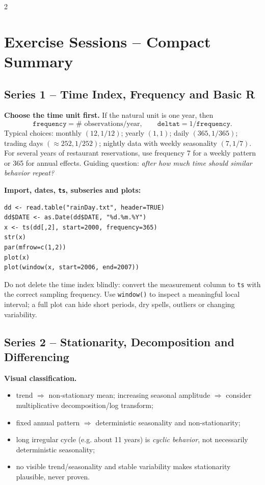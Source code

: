 \documentclass[9pt,a4paper]{extarticle}
\newcommand{\key}[1]{\textbf{#1}}
\begin{document}
\begin{multicols}{2}
\section{Exercise Sessions -- Compact Summary}

\subsection*{Series 1 -- Time Index, Frequency and Basic R}

\key{Choose the time unit first.} If the natural unit is one year, then
\[
\boxed{\texttt{frequency}=\#\text{ observations/year},\qquad
\texttt{deltat}=1/\texttt{frequency}.}
\]
Typical choices: monthly \((12,1/12)\); yearly \((1,1)\); daily \((365,1/365)\); trading days \((\approx252,1/252)\); nightly data with weekly seasonality \((7,1/7)\). For several years of restaurant reservations, use frequency 7 for a weekly pattern or 365 for annual effects. Guiding question: \emph{after how much time should similar behavior repeat?}

\key{Import, dates, \texttt{ts}, subseries and plots:}
{\scriptsize
\begin{verbatim}
dd <- read.table("rainDay.txt", header=TRUE)
dd$DATE <- as.Date(dd$DATE, "%d.%m.%Y")
x <- ts(dd[,2], start=2000, frequency=365)
str(x)
par(mfrow=c(1,2))
plot(x)
plot(window(x, start=2006, end=2007))
\end{verbatim}}
Do not delete the time index blindly: convert the measurement column to \texttt{ts} with the correct sampling frequency. Use \texttt{window()} to inspect a meaningful local interval; a full plot can hide short periods, dry spells, outliers or changing variability.

\subsection*{Series 2 -- Stationarity, Decomposition and Differencing}

\key{Visual classification.}
\begin{itemize}
\item trend \(\Rightarrow\) non-stationary mean; increasing seasonal amplitude \(\Rightarrow\) consider multiplicative decomposition/log transform;
\item fixed annual pattern \(\Rightarrow\) deterministic seasonality and non-stationarity;
\item long irregular cycle (e.g. about 11 years) is \emph{cyclic behavior}, not necessarily deterministic seasonality;
\item no visible trend/seasonality and stable variability makes stationarity plausible, never proven.
\end{itemize}


\end{multicols}
\end{document}
